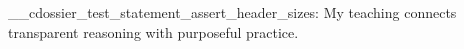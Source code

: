 \documentclass[type=teaching]{careerdossier-statement}
\begin{document}
\MakeCDossierStatementHeader
\ExplSyntaxOn
\__cdossier_test_statement_assert_header_sizes:
\ExplSyntaxOff
My teaching connects transparent reasoning with purposeful practice.
\end{document}
